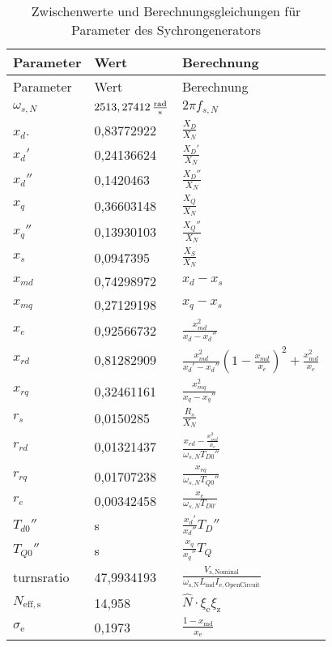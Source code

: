 \begin{longtable}[]{@{}lll@{}}
\caption{Zwischenwerte und Berechnungsgleichungen für Parameter des Sychrongenerators}\label{tab:ZwischenwerteSG}
\tabularnewline
\toprule
Parameter & Wert & Berechnung\tabularnewline
\midrule
\endfirsthead
\toprule
Parameter & Wert & Berechnung\tabularnewline
\midrule
\endhead
\(\omega_{s,N}\) & \(\unit[2513,27412]{\frac{rad}{s}}\) & \(2\pi f_{s,N}\) \tabularnewline
\(x_d\).         & 0,83772922                           & \(\frac{X_D}{X_N}\) \tabularnewline
\(x_d'\)         & 0,24136624                           & \(\frac{X_D'}{X_N}\) \tabularnewline
\(x_d''\)        & 0,1420463                            & \(\frac{X_D''}{X_N}\) \tabularnewline
\(x_q\)          &  0,36603148                          & \(\frac{X_Q}{X_N}\) \tabularnewline
\(x_q''\)        & 0,13930103                           & \(\frac{X_Q''}{X_N}\) \tabularnewline
\(x_s\)          & 0,0947395                            & \(\frac{X_S}{X_N}\) \tabularnewline
\(x_{md}\)       & 0,74298972                           & \(x_d-x_s\) \tabularnewline
\(x_{mq}\)       & 0,27129198                           & \(x_q-x_s\)\tabularnewline
\(x_e\)          & 0,92566732                           & \(\frac{x_{md}^2}{x_d-x_d''}\)\tabularnewline
\(x_{rd}\)       & 0,81282909                           & \(\frac{x_{md}^2}{x_d'-x_d''}(1-\frac{x_{md}}{x_e})^2+\frac{x_{md}^2}{x_e}\) \tabularnewline
\(x_{rq}\)       & 0,32461161                           & \(\frac{x_{mq}^2}{x_q-x_q''}\) \tabularnewline
\(r_s\)          & 0,0150285                            & \(\frac{R_s}{X_N}\) \tabularnewline
\(r_{rd}\)       & 0,01321437                           & \(\frac{x_{rd}-\frac{x_{md}^2}{x_e}}{\omega_{s,N}T_{D0}''}\) \tabularnewline
\(r_{rq}\)       & 0,01707238                           & \(\frac{x_{rq}}{\omega_{s,N}T_{Q0}''}\) \tabularnewline
\(r_e\)          & 0,00342458                           & \(\frac{x_e}{\omega_{s,N}T_{D0'}}\) \tabularnewline
\(T_{d0}''\)     & \unit[0,00651784]{s}                 & \(\frac{x_d'}{x_d''}T_D''\) \tabularnewline
\(T_{Q0}''\)     & \unit[0,00756537]{s}                 & \(\frac{x_q}{x_q''}T_Q\) \tabularnewline
turnsratio       & 47,9934193                           & \(\frac{V_{\mathrm{s,Nominal}}}{\omega_{\mathrm{s,N}}L_{\mathrm{md}}I_{\mathrm{e,OpenCircuit}}}\) \tabularnewline
$N_\mathrm{eff,s}$& 14,958                              & $\hat N\cdot\xi_\mathrm{c}\xi_\mathrm{z}$ \tabularnewline
$\sigma_\mathrm{e}$& 0,1973 & $\frac{1-x_{\mathrm{md}}}{x_\mathrm e}$\tabularnewline
\bottomrule
\end{longtable}

